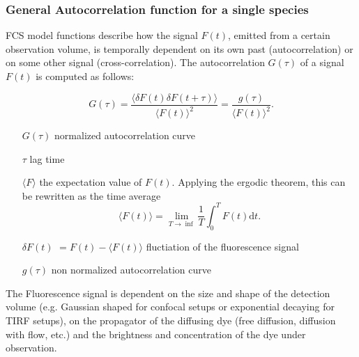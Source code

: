 	\subsubsection{General Autocorrelation function for a single species}
	FCS model functions describe how the signal $F(t)$, emitted from a certain observation volume, is temporally dependent on its own past (autocorrelation) or on some other signal (cross-correlation). The autocorrelation $G(\tau)$ of a signal $F(t)$ is computed as follows:
	\newline
	\newline
	\begin{minipage}{\textwidth}
	\begin{equation}
	G(\tau) = \frac{\langle \delta F(t) \delta F(t+\tau) \rangle}{\langle F(t) \rangle^2} = \frac{g(\tau)}{\langle F(t) \rangle^2}.
	\end{equation}
	\begin{itemize} \small
	\item[$G(\tau)$] normalized autocorrelation curve
	\item[$\tau$] lag time
	\item[$\langle F \rangle$] the expectation value of $F(t)$. Applying the ergodic theorem, this can be rewritten as the time average \[ \langle F(t) \rangle = \lim_{T \rightarrow \inf }\frac{1}{T} \int_0^T F(t) \mathrm{d}t. \]	
	\item[$\delta F(t)$] $= F(t) - \langle F(t) \rangle$ fluctiation of the fluorescence signal
	\item[$g(\tau)$] non normalized autocorrelation curve
	\end{itemize}
	\end{minipage}
	\newline
	\newline
	\newline
	The Fluorescence signal is dependent on the size and shape of the detection volume (e.g. Gaussian shaped for confocal setups or exponential decaying for TIRF setups), on the propagator of the diffusing dye (free diffusion, diffusion with flow, etc.) and the brightness and concentration of the dye under observation.  \\
	\newline
